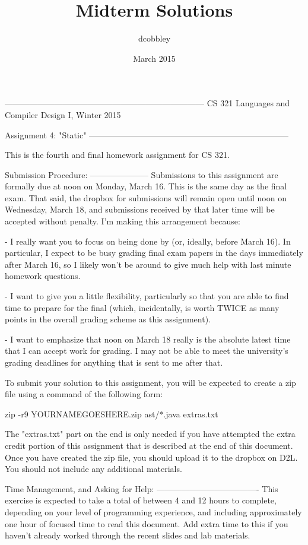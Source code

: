 \documentclass{article}
\title{Midterm Solutions}
\author{dcobbley }
\date{March 2015}
\begin{document}
\maketitle
------------------------------------------------------------------------
CS 321 Languages and Compiler Design I, Winter 2015

Assignment 4: "Static"
------------------------------------------------------------------------

This is the fourth and final homework assignment for CS 321.

Submission Procedure:
---------------------
Submissions to this assignment are formally due at noon on Monday,
March 16.  This is the same day as the final exam.  That said, the
dropbox for submissions will remain open until noon on Wednesday,
March 18, and submissions received by that later time will be accepted
without penalty.  I'm making this arrangement because:

- I really want you to focus on being done by (or, ideally, before
  March 16).  In particular, I expect to be busy grading final exam
  papers in the days immediately after March 16, so I likely won't
  be around to give much help with last minute homework questions.

- I want to give you a little flexibility, particularly so that you
  are able to find time to prepare for the final (which, incidentally,
  is worth TWICE as many points in the overall grading scheme as this
  assignment).

- I want to emphasize that noon on March 18 really is the absolute
  latest time that I can accept work for grading.  I may not be able
  to meet the university's grading deadlines for anything that is sent
  to me after that.

To submit your solution to this assignment, you will be expected to
create a zip file using a command of the following form:

  zip -r9 YOURNAMEGOESHERE.zip ast/*.java extras.txt

The "extras.txt" part on the end is only needed if you have attempted
the extra credit portion of this assignment that is described at the
end of this document.  Once you have created the zip file, you should
upload it to the dropbox on D2L.  You should not include any additional
materials.

Time Management, and Asking for Help:
-------------------------------------
This exercise is expected to take a total of between 4 and 12 hours
to complete, depending on your level of programming experience, and
including approximately one hour of focused time to read this
document.  Add extra time to this if you haven't already worked
through the recent slides and lab materials.
\end{document}
